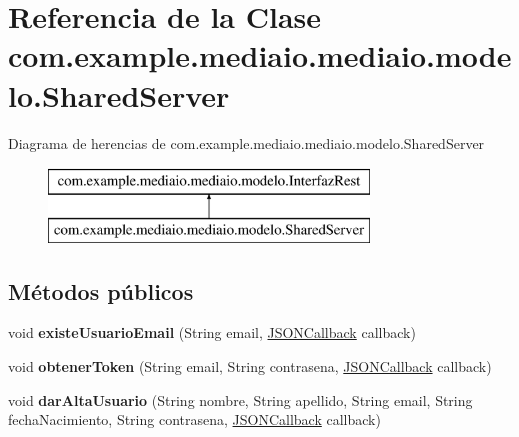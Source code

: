 \hypertarget{classcom_1_1example_1_1mediaio_1_1mediaio_1_1modelo_1_1_shared_server}{}\section{Referencia de la Clase com.\+example.\+mediaio.\+mediaio.\+modelo.\+Shared\+Server}
\label{classcom_1_1example_1_1mediaio_1_1mediaio_1_1modelo_1_1_shared_server}
Diagrama de herencias de com.\+example.\+mediaio.\+mediaio.\+modelo.\+Shared\+Server\begin{figure}[H]
\begin{center}
\leavevmode
\includegraphics[height=2.000000cm]{classcom_1_1example_1_1mediaio_1_1mediaio_1_1modelo_1_1_shared_server}
\end{center}
\end{figure}
\subsection*{Métodos públicos}
\begin{DoxyCompactItemize}
\item 
\mbox{\label{classcom_1_1example_1_1mediaio_1_1mediaio_1_1modelo_1_1_shared_server_a2c323a3b687cd93bc37169851613677e}} 
void {\bfseries existe\+Usuario\+Email} (String email, \hyperlink{classcom_1_1example_1_1mediaio_1_1mediaio_1_1modelo_1_1_j_s_o_n_callback}{J\+S\+O\+N\+Callback} callback)
\item 
\mbox{\label{classcom_1_1example_1_1mediaio_1_1mediaio_1_1modelo_1_1_shared_server_a40a577740aa2136f26ccd90a64910724}} 
void {\bfseries obtener\+Token} (String email, String contrasena, \hyperlink{classcom_1_1example_1_1mediaio_1_1mediaio_1_1modelo_1_1_j_s_o_n_callback}{J\+S\+O\+N\+Callback} callback)
\item 
\mbox{\label{classcom_1_1example_1_1mediaio_1_1mediaio_1_1modelo_1_1_shared_server_ae8246b8fc9964cccf9732d22952f1e08}} 
void {\bfseries dar\+Alta\+Usuario} (String nombre, String apellido, String email, String fecha\+Nacimiento, String contrasena, \hyperlink{classcom_1_1example_1_1mediaio_1_1mediaio_1_1modelo_1_1_j_s_o_n_callback}{J\+S\+O\+N\+Callback} callback)
\end{DoxyCompactItemize}
